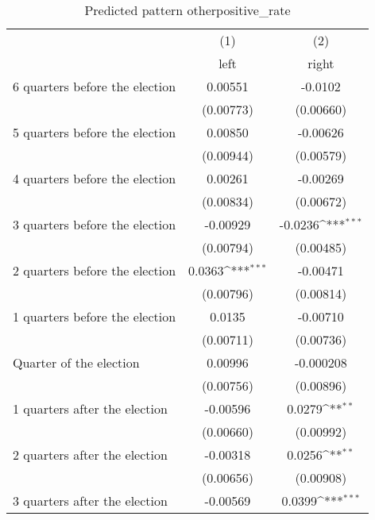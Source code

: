\begin{table}[htbp]\centering
\def\sym#1{\ifmmode^{#1}\else\(^{#1}\)\fi}
\caption{Predicted pattern otherpositive\_rate}
\begin{tabular}{l*{2}{c}}
\hline\hline
                    &\multicolumn{1}{c}{(1)}&\multicolumn{1}{c}{(2)}\\
                    &\multicolumn{1}{c}{left}&\multicolumn{1}{c}{right}\\
\hline
 6 quarters before the election&     0.00551         &     -0.0102         \\
                    &   (0.00773)         &   (0.00660)         \\
[1em]
 5 quarters before the election&     0.00850         &    -0.00626         \\
                    &   (0.00944)         &   (0.00579)         \\
[1em]
 4 quarters before the election&     0.00261         &    -0.00269         \\
                    &   (0.00834)         &   (0.00672)         \\
[1em]
 3 quarters before the election&    -0.00929         &     -0.0236\sym{***}\\
                    &   (0.00794)         &   (0.00485)         \\
[1em]
 2 quarters before the election&      0.0363\sym{***}&    -0.00471         \\
                    &   (0.00796)         &   (0.00814)         \\
[1em]
 1 quarters before the election&      0.0135         &    -0.00710         \\
                    &   (0.00711)         &   (0.00736)         \\
[1em]
Quarter of the election&     0.00996         &   -0.000208         \\
                    &   (0.00756)         &   (0.00896)         \\
[1em]
 1 quarters after the election&    -0.00596         &      0.0279\sym{**} \\
                    &   (0.00660)         &   (0.00992)         \\
[1em]
 2 quarters after the election&    -0.00318         &      0.0256\sym{**} \\
                    &   (0.00656)         &   (0.00908)         \\
[1em]
 3 quarters after the election&    -0.00569         &      0.0399\sym{***}\\

\end{tabular}
\end{table}
